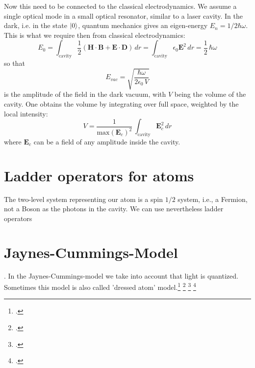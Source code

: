 Now this need to be connected to the classical electrodynamics. We assume a single optical mode in a small optical resonator, similar to a laser cavity. In the dark, i.e. in the state $\ket{0}$, quantum mechanics gives an eigen-energy $E_n = 1/2 \hbar \omega$. This is what we require then from classical electrodynamics:
\[
E_0 = 
 \int_\text{cavity} \frac{1}{2} 
 \left( \boldsymbol{H} \cdot  \boldsymbol{B} + \boldsymbol{E} \cdot  \boldsymbol{D} \right) \, dr = 
  \int_\text{cavity}  \epsilon_0 \boldsymbol{E}^2 \, dr = \frac{1}{2} \, \hbar \omega
\]
so that
\[
E_{vac} = \sqrt{\frac{\hbar \omega}{2 \epsilon_0 \, V}}
\]
is the amplitude of the field in the dark vacuum, with $V$ being the volume of the cavity. One obtains the volume by integrating over full space, weighted by the local intensity:
\[
V =  \frac{1}{\text{max}(\boldsymbol{E}_c)^2} \, \int_\text{cavity} \boldsymbol{E}_c^2\, dr
\]
where $\boldsymbol{E}_c$ can be a field of any amplitude inside the cavity.

\section{Ladder operators for atoms}

The two-level system representing our atom is a spin $1/2$ system, i.e., a Fermion, not a Boson as the photons in the cavity. We can use nevertheless ladder operators 




\section{Jaynes-Cummings-Model}
. In the Jaynes-Cummings-model we take into account that light is quantized. Sometimes this model is also called 'dressed atom' model.\footcite[chap. 6.8]{Rand2016} \footcite[chap. 4.5]{GerryKnight2005} \footcite[chap. 10.4]{Fox}  \footcite[chap. 3.4]{HarocheRaimond2006}

\printbibliography[segment=\therefsegment,heading=subbibliography]
